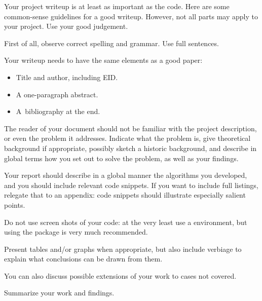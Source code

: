 
Your project writeup is at least as important as the code.  Here are
some common-sense guidelines for a good writeup. However, not all
parts may apply to your project. Use your good judgement.


First of all, observe correct spelling and grammar.
Use full sentences.


Your writeup needs to have the same elements as a good paper:
\begin{itemize}
\item Title and author, including EID.
\item A one-paragraph abstract.
\item A~bibliography at the end.
\end{itemize}


The reader of your document should not be familiar with the project
description, or even the problem it addresses.  Indicate what the
problem is, give theoretical background if appropriate, possibly
sketch a historic background, and describe in global terms how you set
out to solve the problem, as well as your findings.


Your report should describe in a global manner the algorithms you
developed, and you should include relevant code snippets. If you want
to include full listings, relegate that to an appendix: code snippets
should illustrate especially salient points.

Do not use screen shots of your code: at the very least use a
 environment, but using the  package is very
much recommended.


Present tables and/or graphs when appropriate, but also include
verbiage to explain what conclusions can be drawn from them.

You can also discuss possible extensions of your work to cases not covered.


Summarize your work and findings.


